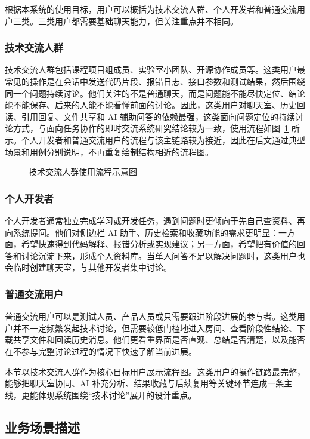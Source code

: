 根据本系统的使用目标，用户可以概括为技术交流人群、个人开发者和普通交流用户三类。三类用户都需要基础聊天能力，但关注重点并不相同。

\subsubsection{技术交流人群}

技术交流人群包括课程项目组成员、实验室小团队、开源协作成员等。这类用户最常见的操作是在会话中发送代码片段、报错日志、接口参数和测试结果，然后围绕同一个问题持续讨论。他们关注的不是普通聊天，而是问题能不能尽快定位、结论能不能保存、后来的人能不能看懂前面的讨论。因此，这类用户对聊天室、历史回读、引用回复、文件共享和 AI 辅助问答的依赖最强，这类面向问题定位的持续讨论方式，与面向任务协作的即时交流系统研究结论较为一致\cite{imdesign2023}，使用流程如图~\ref{fig:3-1} 所示。个人开发者和普通交流用户的流程与该主链路较为接近，因此在后文通过典型场景和用例分别说明，不再重复绘制结构相近的流程图。

\begin{figure}[H]
\centering
{}
\caption{技术交流人群使用流程示意图}
\label{fig:3-1}
\end{figure}

\subsubsection{个人开发者}

个人开发者通常独立完成学习或开发任务，遇到问题时更倾向于先自己查资料、再向系统提问。他们对侧边栏 AI 助手、历史检索和收藏功能的需求更明显：一方面，希望快速得到代码解释、报错分析或实现建议；另一方面，希望把有价值的回答和讨论沉淀下来，形成个人资料库。当单人问答不足以解决问题时，这类用户也会临时创建聊天室，与其他开发者集中讨论。

\subsubsection{普通交流用户}

普通交流用户可以是测试人员、产品人员或只需要跟进阶段进展的参与者。这类用户并不一定频繁发起技术讨论，但需要较低门槛地进入房间、查看阶段性结论、下载共享文件和回读历史消息。他们更看重界面是否直观、总结是否清楚，以及能否在不参与完整讨论过程的情况下快速了解当前进展。

本节以技术交流人群作为核心目标用户展示流程图。这类用户的操作链路最完整，能够把聊天室协同、AI 补充分析、结果收藏与后续复用等关键环节连成一条主线，更能体现系统围绕“技术讨论”展开的设计重点。
\subsection{业务场景描述}

